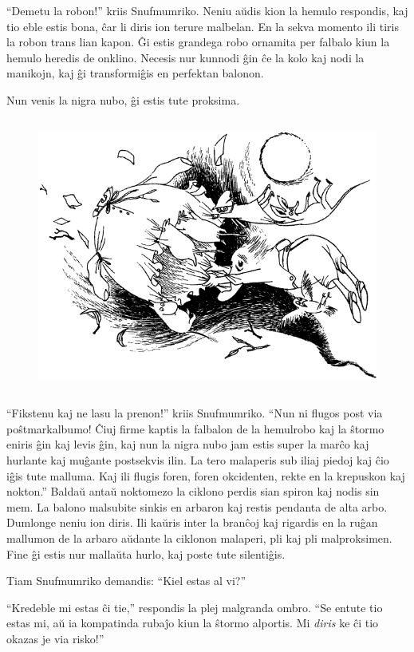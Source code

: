 ``Demetu la robon!'' kriis Snufmumriko. Neniu aŭdis kion la hemulo respondis, kaj tio eble estis bona, ĉar li diris ion terure malbelan. En la sekva momento ili tiris la robon trans lian kapon. Ĝi estis grandega robo ornamita per falbalo kiun la hemulo heredis de onklino. Necesis nur kunnodi ĝin ĉe la kolo kaj nodi la manikojn, kaj ĝi transformiĝis en perfektan balonon.

Nun venis la nigra nubo, ĝi estis tute proksima.

\begin{figure}[htbp]
\centering
\includegraphics[width=350pt,height=255pt]{8-8.png}
\caption{}
\label{8-8}
\end{figure}

``Fikstenu kaj ne lasu la prenon!'' kriis Snufmumriko. ``Nun ni flugos post via poŝtmarkalbumo! Ĉiuj firme kaptis la falbalon de la hemulrobo kaj la ŝtormo eniris ĝin kaj levis ĝin, kaj nun la nigra nubo jam estis super la marĉo kaj hurlante kaj muĝante postsekvis ilin. La tero malaperis sub iliaj piedoj kaj ĉio iĝis tute malluma. Kaj ili flugis foren, foren okcidenten, rekte en la krepuskon kaj nokton.''
\sectionbreak
Baldaŭ antaŭ noktomezo la ciklono perdis sian spiron kaj nodis sin mem. La balono malsubite sinkis en arbaron kaj restis pendanta de alta arbo. Dumlonge neniu ion diris. Ili kaŭris inter la branĉoj kaj rigardis en la ruĝan mallumon de la arbaro aŭdante la ciklonon malaperi, pli kaj pli malproksimen. Fine ĝi estis nur mallaŭta hurlo, kaj poste tute silentiĝis.

Tiam Snufmumriko demandis: ``Kiel estas al vi?''

``Kredeble mi estas ĉi tie,'' respondis la plej malgranda ombro. ``Se entute tio estas mi, aŭ ia kompatinda rubaĵo kiun la ŝtormo alportis. Mi \emph{diris} ke ĉi tio okazas je via risko!''

